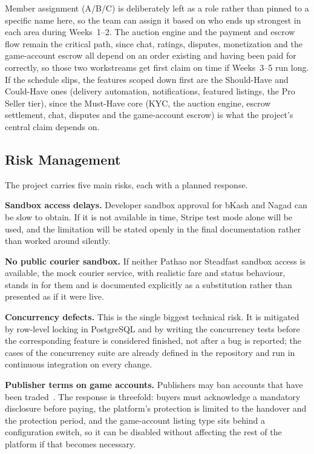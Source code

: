 \documentclass[11pt,a4paper]{article}
\begin{document}
Member assignment (A/B/C) is deliberately left as a role rather than pinned to a specific name here, so the
team can assign it based on who ends up strongest in each area during Weeks~1--2. The auction engine and the
payment and escrow flow remain the critical path, since chat, ratings, disputes, monetization and the
game-account escrow all depend on an order existing and having been paid for correctly, so those two
workstreams get first claim on time if Weeks~3--5 run long. If the schedule slips, the features scoped down
first are the Should-Have and Could-Have ones (delivery automation, notifications, featured listings, the Pro
Seller tier), since the Must-Have core (KYC, the auction engine, escrow settlement, chat, disputes and the
game-account escrow) is what the project's central claim depends on.

\subsection{Risk Management}

The project carries five main risks, each with a planned response.

\textbf{Sandbox access delays.} Developer sandbox approval for bKash and Nagad can be slow to obtain. If it
is not available in time, Stripe test mode alone will be used, and the limitation will be stated openly in
the final documentation rather than worked around silently.

\textbf{No public courier sandbox.} If neither Pathao nor Steadfast sandbox access is available, the mock
courier service, with realistic fare and status behaviour, stands in for them and is documented explicitly
as a substitution rather than presented as if it were live.

\textbf{Concurrency defects.} This is the single biggest technical risk. It is mitigated by row-level
locking in PostgreSQL and by writing the concurrency tests before the corresponding feature is considered
finished, not after a bug is reported; the cases of the concurrency suite are already defined in the
repository and run in continuous integration on every change.

\textbf{Publisher terms on game accounts.} Publishers may ban accounts that have been
traded~\cite[\S5.2]{supp}. The response is threefold: buyers must acknowledge a mandatory disclosure before
paying, the platform's protection is limited to the handover and the protection period, and the
game-account listing type sits behind a configuration switch, so it can be disabled without affecting the
rest of the platform if that becomes necessary.
\end{document}
